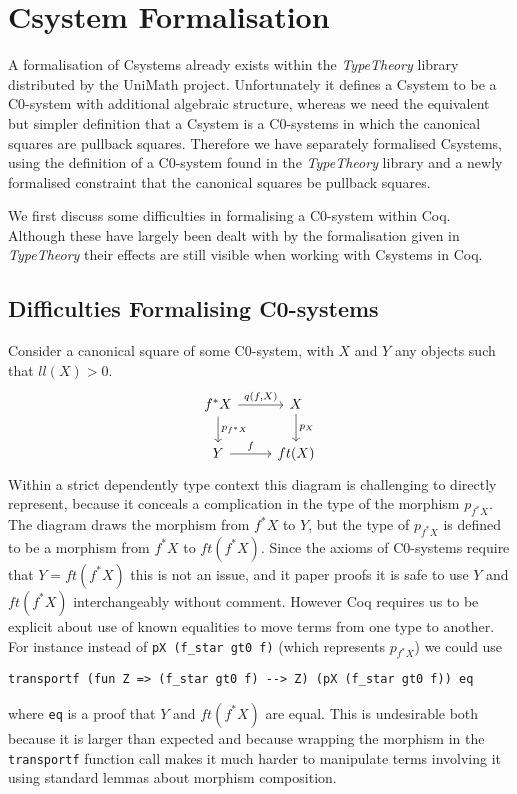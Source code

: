 \chapter{Csystem Formalisation}
A formalisation of Csystems already exists within the \textit{TypeTheory}
library distributed by the UniMath project. Unfortunately it defines a Csystem
to be a C0-system with additional algebraic structure, whereas we need the
equivalent but simpler definition that a Csystem is a C0-systems in which the
canonical squares are pullback squares. Therefore we have separately formalised
Csystems, using the definition of a C0-system found in the \textit{TypeTheory}
library and a newly formalised constraint that the canonical squares be pullback
squares.

We first discuss some difficulties in formalising a C0-system within Coq.
Although these have largely been dealt with by the formalisation given in
\textit{TypeTheory} their effects are still visible when working with Csystems
in Coq.

\section{Difficulties Formalising C0-systems}
Consider a canonical square of some C0-system, with $X$ and $Y$ any objects such
that $ll(X) > 0$.
\[
\begin{tikzcd}
    f^*X\ar[r,"{q(f,X)}"]\ar[d,"p_{f^*X}"]&X\ar[d,"p_X"] \\
    Y\ar[r,"f"]&ft(X)
\end{tikzcd}
\]
Within a strict dependently type context this diagram is challenging to directly
represent, because it conceals a complication in the type of the morphism
$p_{f^*X}$. The diagram draws the morphism from $f^*X$ to $Y$, but the type of
$p_{f^*X}$ is defined to be a morphism from $f^*X$ to $ft(f^*X)$. Since the
axioms of C0-systems require that $Y=ft(f^*X)$ this is not an issue, and it
paper proofs it is safe to use $Y$ and $ft(f^*X)$ interchangeably without
comment. However Coq requires us to be explicit about use of known equalities to
move terms from one type to another. For instance instead of 
\lstinline|pX (f_star gt0 f)| (which represents $p_{f^*X}$) we could use
\begin{lstlisting}
transportf (fun Z => (f_star gt0 f) --> Z) (pX (f_star gt0 f)) eq
\end{lstlisting}
where \lstinline|eq| is a proof that $Y$ and $ft(f^*X)$ are equal. This is
undesirable both because it is larger than expected and because wrapping the
morphism in the \lstinline|transportf| function call makes it much harder to
manipulate terms involving it using standard lemmas about morphism composition.

